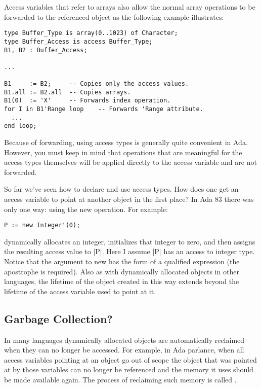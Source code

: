 Access variables that refer to arrays also allow the normal array operations to be forwarded to
the referenced object as the following example illustrates:

\begin{lstlisting}
type Buffer_Type is array(0..1023) of Character;
type Buffer_Access is access Buffer_Type;
B1, B2 : Buffer_Access;

...

B1     := B2;     -- Copies only the access values.
B1.all := B2.all  -- Copies arrays.
B1(0)  := 'X'     -- Forwards index operation.
for I in B1'Range loop    -- Forwards 'Range attribute.
  ...
end loop;
\end{lstlisting}

Because of forwarding, using access types is generally quite convenient in Ada. However, you
must keep in mind that operations that are meaningful for the access types themselves will be
applied directly to the access variable and are not forwarded.

So far we've seen how to declare and use access types. How does one get an access variable to
point at another object in the first place? In Ada 83 there was only one way: using the new
operation. For example:

\begin{lstlisting}
P := new Integer'(0);
\end{lstlisting}

dynamically allocates an integer, initializes that integer to zero, and then assigns the
resulting access value to |P|. Here I assume |P| has an access to integer type. Notice that the
argument to new has the form of a qualified expression (the apostrophe is required). Also as
with dynamically allocated objects in other languages, the lifetime of the object created in
this way extends beyond the lifetime of the access variable used to point at it.

\subsection{Garbage Collection?}

In many languages dynamically allocated objects are automatically reclaimed when they can no
longer be accessed. For example, in Ada parlance, when all access variables pointing at an
object go out of scope the object that was pointed at by those variables can no longer be
referenced and the memory it uses should be made available again. The process of reclaiming such
memory is called .

